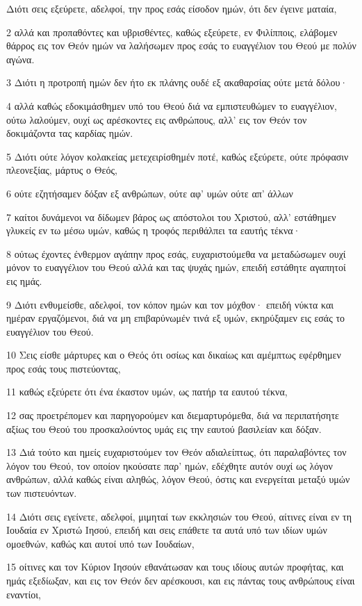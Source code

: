 \par Διότι σεις εξεύρετε, αδελφοί, την προς εσάς είσοδον ημών, ότι δεν έγεινε ματαία,
\par 2 αλλά και προπαθόντες και υβρισθέντες, καθώς εξεύρετε, εν Φιλίπποις, ελάβομεν θάρρος εις τον Θεόν ημών να λαλήσωμεν προς εσάς το ευαγγέλιον του Θεού με πολύν αγώνα.
\par 3 Διότι η προτροπή ημών δεν ήτο εκ πλάνης ουδέ εξ ακαθαρσίας ούτε μετά δόλου·
\par 4 αλλά καθώς εδοκιμάσθημεν υπό του Θεού διά να εμπιστευθώμεν το ευαγγέλιον, ούτω λαλούμεν, ουχί ως αρέσκοντες εις ανθρώπους, αλλ' εις τον Θεόν τον δοκιμάζοντα τας καρδίας ημών.
\par 5 Διότι ούτε λόγον κολακείας μετεχειρίσθημέν ποτέ, καθώς εξεύρετε, ούτε πρόφασιν πλεονεξίας, μάρτυς ο Θεός,
\par 6 ούτε εζητήσαμεν δόξαν εξ ανθρώπων, ούτε αφ' υμών ούτε απ' άλλων
\par 7 καίτοι δυνάμενοι να δίδωμεν βάρος ως απόστολοι του Χριστού, αλλ' εστάθημεν γλυκείς εν τω μέσω υμών, καθώς η τροφός περιθάλπει τα εαυτής τέκνα·
\par 8 ούτως έχοντες ένθερμον αγάπην προς εσάς, ευχαριστούμεθα να μεταδώσωμεν ουχί μόνον το ευαγγέλιον του Θεού αλλά και τας ψυχάς ημών, επειδή εστάθητε αγαπητοί εις ημάς.
\par 9 Διότι ενθυμείσθε, αδελφοί, τον κόπον ημών και τον μόχθον· επειδή νύκτα και ημέραν εργαζόμενοι, διά να μη επιβαρύνωμέν τινά εξ υμών, εκηρύξαμεν εις εσάς το ευαγγέλιον του Θεού.
\par 10 Σεις είσθε μάρτυρες και ο Θεός ότι οσίως και δικαίως και αμέμπτως εφέρθημεν προς εσάς τους πιστεύοντας,
\par 11 καθώς εξεύρετε ότι ένα έκαστον υμών, ως πατήρ τα εαυτού τέκνα,
\par 12 σας προετρέπομεν και παρηγορούμεν και διεμαρτυρόμεθα, διά να περιπατήσητε αξίως του Θεού του προσκαλούντος υμάς εις την εαυτού βασιλείαν και δόξαν.
\par 13 Διά τούτο και ημείς ευχαριστούμεν τον Θεόν αδιαλείπτως, ότι παραλαβόντες τον λόγον του Θεού, τον οποίον ηκούσατε παρ' ημών, εδέχθητε αυτόν ουχί ως λόγον ανθρώπων, αλλά καθώς είναι αληθώς, λόγον Θεού, όστις και ενεργείται μεταξύ υμών των πιστευόντων.
\par 14 Διότι σεις εγείνετε, αδελφοί, μιμηταί των εκκλησιών του Θεού, αίτινες είναι εν τη Ιουδαία εν Χριστώ Ιησού, επειδή και σεις επάθετε τα αυτά υπό των ιδίων υμών ομοεθνών, καθώς και αυτοί υπό των Ιουδαίων,
\par 15 οίτινες και τον Κύριον Ιησούν εθανάτωσαν και τους ιδίους αυτών προφήτας, και ημάς εξεδίωξαν, και εις τον Θεόν δεν αρέσκουσι, και εις πάντας τους ανθρώπους είναι εναντίοι,
